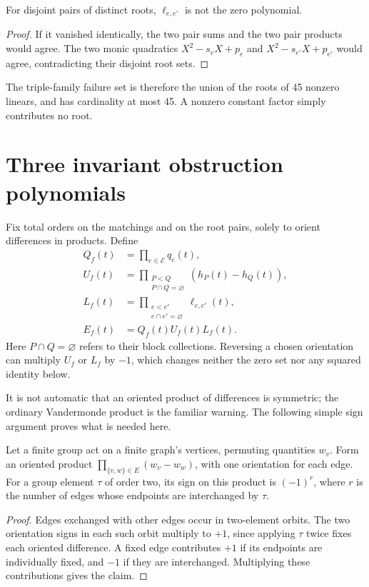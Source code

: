 \documentclass[11pt,letterpaper]{article}
\numberwithin{equation}{section}
\theoremstyle{definition}
\theoremstyle{remark}
\newcommand{\Edges}{\mathcal E}
\begin{document}
\begin{lemma}
\label{sbr:lem:ell-nonzero}
For disjoint pairs of distinct roots, $\ell_{e,e'}$ is not the zero
polynomial.
\end{lemma}
\begin{proof}
If it vanished identically, the two pair sums and the two pair products
would agree. The two monic quadratics $X^2-s_eX+p_e$ and
$X^2-s_{e'}X+p_{e'}$ would agree, contradicting their disjoint root sets.
\end{proof}

The triple-family failure set is therefore the union of the roots of 45
nonzero linears, and has cardinality at most 45. A nonzero constant factor
simply contributes no root.

\section{Three invariant obstruction polynomials}
\label{sbr:sec:obstruction}

Fix total orders on the matchings and on the root pairs, solely to orient
differences in products. Define
\begin{align}
 Q_f(t)&=\prod_{e\in\Edges}q_e(t),\label{sbr:eq:Q}\\
 U_f(t)&=\prod_{\substack{P<Q\\P\cap Q=\varnothing}}(h_P(t)-h_Q(t)),
 \label{sbr:eq:U}\\
 L_f(t)&=\prod_{\substack{e<e'\\e\cap e'=\varnothing}}
             \ell_{e,e'}(t),\label{sbr:eq:L}\\
 E_f(t)&=Q_f(t)U_f(t)L_f(t).\label{sbr:eq:E}
\end{align}
Here $P\cap Q=\varnothing$ refers to their block collections. Reversing a
chosen orientation can multiply $U_f$ or $L_f$ by $-1$, which changes
neither the zero set nor any squared identity below.

It is not automatic that an oriented product of differences is symmetric;
the ordinary Vandermonde product is the familiar warning. The following
simple sign argument proves what is needed here.

\begin{lemma}
\label{sbr:lem:graph-sign}
Let a finite group act on a finite graph's vertices, permuting quantities
$w_v$. Form an oriented product $\prod_{\{v,w\}\in E}(w_v-w_w)$, with one
orientation for each edge. For a group element $\tau$ of order two, its
sign on this product is $(-1)^r$, where $r$ is the number of edges whose
endpoints are interchanged by $\tau$.
\end{lemma}
\begin{proof}
Edges exchanged with other edges occur in two-element orbits. The two
orientation signs in each such orbit multiply to $+1$, since applying
$\tau$ twice fixes each oriented difference. A fixed edge contributes $+1$
if its endpoints are individually fixed, and $-1$ if they are interchanged.
Multiplying these contributions gives the claim.
\end{proof}
\end{document}
